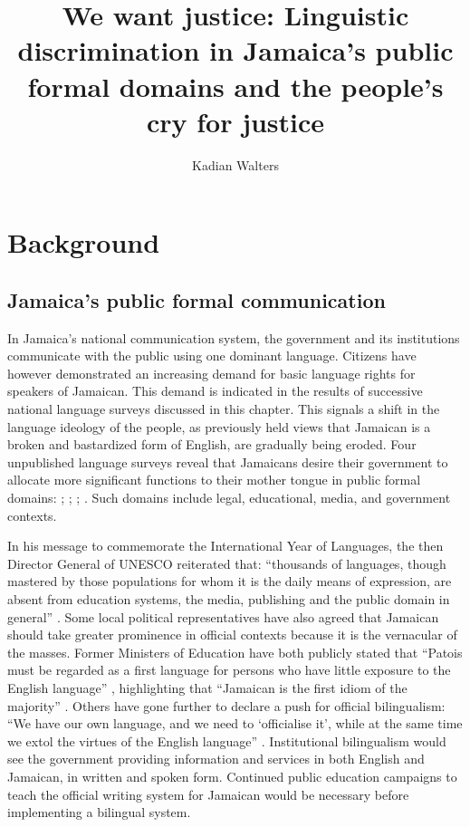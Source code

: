 \documentclass[output=paper,colorlinks,citecolor=brown]{langscibook}
\author{Kadian Walters\affiliation{The University of the West Indies, Mona}}
\title[We want justice]{We want justice: Linguistic discrimination in Jamaica’s public formal domains and the people’s cry for justice}
\begin{document}
\maketitle

\section{Background}

\subsection{Jamaica’s public formal communication}

In Jamaica’s national communication system, the government and its institutions communicate with the public using one dominant language. Citizens have however demonstrated an increasing demand for basic language rights for speakers of Jamaican. This demand is indicated in the results of successive national language surveys discussed in this chapter. This signals a shift in the language ideology of the people, as previously held views that Jamaican is a broken and bastardized form of English, are gradually being eroded. Four unpublished language surveys reveal that Jamaicans desire their government to allocate more significant functions to their mother tongue in public formal domains: \citet{JamaicanLanguageUnit2015};  \citet{LanguageUse_inthe_CourtRoom20015}; \citet{LanguageUse_in_PublicAgencies2016}; \citet{LanguageUse_inthe_JamaicanMediaSurvey2017}. Such domains include legal, educational, media, and government contexts. 

\begin{sloppypar}
In his message to commemorate the International Year of Languages, the then Director General of UNESCO reiterated that: “thousands of languages, though mastered by those populations for whom it is the daily means of expression, are absent from education systems, the media, publishing and the public domain in general” \citep{Matsuura2007}. Some local political representatives have also agreed that Jamaican should take greater prominence in official contexts because it is the vernacular of the masses. Former Ministers of Education have both publicly stated that “Patois must be regarded as a first language for persons who have little exposure to the English language” \citep{Reid2017}, highlighting that “Jamaican is the first idiom of the majority” \citep{Thwaites2018}. Others have gone further to declare a push for official bilingualism: “We have our own language, and we need to `officialise it', while at the same time we extol the virtues of the English language” \citep{Smith2012}. Institutional bilingualism would see the government providing information and services in both English and Jamaican, in written and spoken form. Continued public education campaigns to teach the official writing system for Jamaican would be necessary before implementing a bilingual system.
\end{sloppypar}
\end{document}

